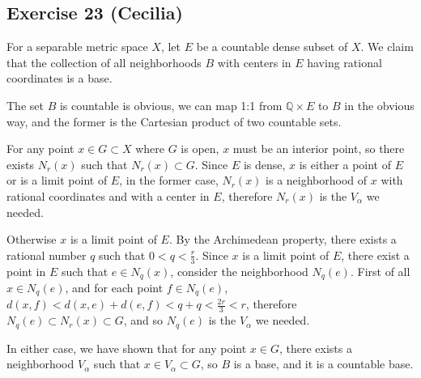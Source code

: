 \subsection*{Exercise 23 (Cecilia)}
For a separable metric space $ X $, let $ E $ be a countable dense subset of $ X $. We claim that the collection of all neighborhoods $ B $ with centers in $ E $ having rational coordinates is a base.

The set $ B $ is countable is obvious, we can map 1:1 from $ \mathbb{Q} \times E $ to $ B $ in the obvious way, and the former is the Cartesian product of two countable sets.

For any point $ x \in G \subset X $ where $ G $ is open, $ x $ must be an interior point, so there exists $ N_r(x) $ such that $ N_r(x) \subset G $. Since $ E $ is dense, $ x $ is either a point of $ E $ or is a limit point of $ E $, in the former case, $ N_r(x) $ is a neighborhood of $ x $ with rational coordinates and with a center in $ E $, therefore $ N_r(x) $ is the $ V_{\alpha} $ we needed.

Otherwise $ x $ is a limit point of $ E $. By the Archimedean property, there exists a rational number $ q $ such that $ 0 < q < \frac{r}{3} $. Since $ x $ is a limit point of $ E $, there exist a point in $ E $ such that $ e \in N_q(x) $, consider the neighborhood $ N_q(e) $. First of all $ x \in N_q(e) $, and for each point $ f \in N_q(e) $, $ d(x, f) < d(x, e) + d(e, f) < q + q < \frac{2r}{3} < r $, therefore $ N_q(e) \subset N_r(x) \subset G $, and so $ N_q(e) $ is the $ V_{\alpha} $ we needed.

In either case, we have shown that for any point $ x \in G $, there exists a neighborhood $ V_{\alpha} $ such that $ x \in V_{\alpha} \subset G $, so $ B $ is a base, and it is a countable base.